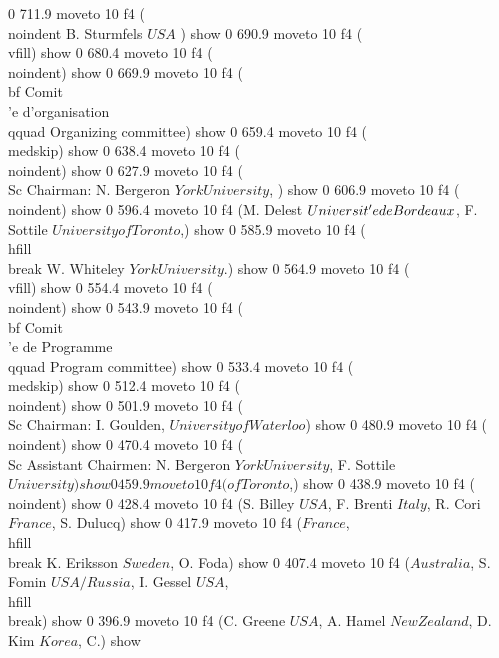 0 711.9 moveto
10 f4
(\\noindent  B. Sturmfels \(USA\) ) show
0 690.9 moveto
10 f4
(\\vfill) show
0 680.4 moveto
10 f4
(\\noindent) show
0 669.9 moveto
10 f4
({\\bf  Comit\\'e d'organisation \\qquad Organizing committee}) show
0 659.4 moveto
10 f4
(\\medskip) show
0 638.4 moveto
10 f4
(\\noindent) show
0 627.9 moveto
10 f4
({\\Sc Chairman}: N. Bergeron \(York University\), ) show
0 606.9 moveto
10 f4
(\\noindent) show
0 596.4 moveto
10 f4
(M. Delest \(Universit\\'e de Bordeaux\), F. Sottile \(University of Toronto\),) show
0 585.9 moveto
10 f4
(\\hfill\\break W. Whiteley \(York University\).) show
0 564.9 moveto
10 f4
(\\vfill) show
0 554.4 moveto
10 f4
(\\noindent) show
0 543.9 moveto
10 f4
({\\bf  Comit\\'e de Programme \\qquad Program committee}) show
0 533.4 moveto
10 f4
(\\medskip) show
0 512.4 moveto
10 f4
(\\noindent) show
0 501.9 moveto
10 f4
({\\Sc Chairman}: I. Goulden,  \(University of Waterloo\)) show
0 480.9 moveto
10 f4
(\\noindent) show
0 470.4 moveto
10 f4
({\\Sc Assistant Chairmen}: N. Bergeron \(York University\), F. Sottile \(University) show
0 459.9 moveto
10 f4
( of Toronto\),) show
0 438.9 moveto
10 f4
(\\noindent) show
0 428.4 moveto
10 f4
(S. Billey \(USA\), F. Brenti \(Italy\), R. Cori \(France\),  S. Dulucq) show
0 417.9 moveto
10 f4
(\(France\), \\hfill\\break  K. Eriksson \(Sweden\), O. Foda) show
0 407.4 moveto
10 f4
(\(Australia\),  S. Fomin \(USA/Russia\), I. Gessel \(USA\), \\hfill\\break) show
0 396.9 moveto
10 f4
(C. Greene \(USA\),  A. Hamel \(New Zealand\), D. Kim \(Korea\), C.) show

